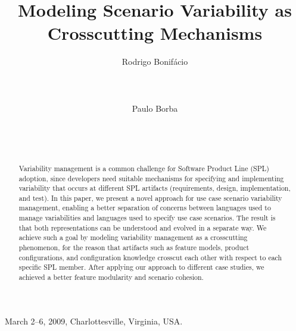 \documentclass{sig-alternate}
\begin{document}
 {March 2--6, 2009, Charlottesville, Virginia, USA.} 


\lstset{language=Haskell, numbers=left,
numberstyle=\tiny,numbersep=5pt,basicstyle=\scriptsize,aboveskip=20pt}

\title{Modeling Scenario Variability as Crosscutting Mechanisms}



\author{
\alignauthor
Rodrigo Bonif\'{a}cio\\
       \\
       \\
       \\
\alignauthor
Paulo Borba\\
       \\
       \\
       \\
}

\maketitle

\begin{abstract}
Variability management is a common challenge for Software Product
Line (SPL) adoption, since developers need suitable
mechanisms for specifying and implementing variability
that occurs at different SPL artifacts (requirements, design,
implementation, and test). In this paper, we present a novel approach for
use case scenario variability management, enabling a better
separation of concerns between languages used to manage
variabilities and languages used to specify use case scenarios. The
result is that both representations can be understood and evolved in
a separate way. We achieve such a goal by modeling variability management
as a crosscutting phenomenon, for the reason that artifacts such as feature models,
product configurations, and configuration knowledge crosscut each
other with respect to each specific SPL member. After applying our approach to
different case studies, we achieved a better feature modularity and scenario cohesion.
\end{abstract}
\end{document}
